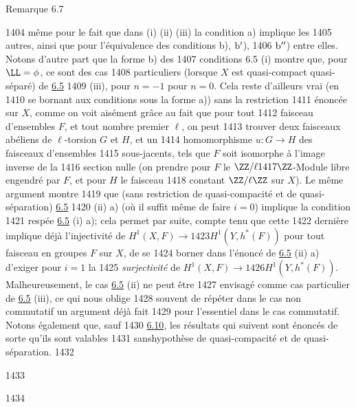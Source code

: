 \begin{enonce*}[remark]{Remarque 6.7}
\begin{enumerate}
  1404	même pour le fait que dans (i) (ii) (iii) la condition a) implique les
  1405	autres, ainsi que pour l'équivalence des conditions b), ${\rm b'}$),
  1406	${\rm b''}$) entre elles. Notons d'autre part que la forme b) des
  1407	conditions 6.5 (i) montre que, pour $\LL=\phi$, ce sont des cas
  1408	particuliers (lorsque $X$ est quasi-compact quasi-séparé) de \hyperref[XII.prop6.5]{6.5}
  1409	(iii), pour $n=-1$ \resp pour $n=0$. Cela reste d'ailleurs vrai (en
  1410	se bornant aux conditions sous la forme a)) sans la restriction
  1411	énoncée sur $X$, comme on voit aisément grâce au fait que pour tout
  1412	faisceau d'ensembles $F$, et tout nombre premier $\ell$, on peut
  1413	trouver deux faisceaux abéliens de $\ell$-torsion $G$ et $H$, et un
  1414	homomorphisme $u:G\rightarrow H$ des faisceaux d'ensembles
  1415	sous-jacents, tels que $F$ soit isomorphe à l'image inverse de la
  1416	section nulle (on prendre pour $F$ le $\ZZ/\ell
  1417	\ZZ$-Module libre engendré par $F$, et pour $H$ le faisceau
  1418	constant $\ZZ/\ell\ZZ$ sur $X$). Le même argument montre
  1419	que (sans restriction de quasi-compacité et de quasi-séparation) \hyperref[XII.prop6.5]{6.5}
  1420	(ii) a) (où il suffit même de faire $i=0$) implique la condition
  1421	respée \hyperref[XII.prop6.5]{6.5} (i) a); cela permet par suite, compte tenu que cette
  1422	dernière implique déjà l'injectivité de $H^1(X,F)\rightarrow
  1423	H^1(Y,h^{\ast}(F))$ pour tout faisceau en groupes $F$ sur $X$, de se
  1424	borner dans l'énoncé de \hyperref[XII.prop6.5]{6.5} (ii) a) d'exiger pour $i=1$ la
  1425	\emph{surjectivité} de $H^1(X,F)\rightarrow
  1426	H^1(Y,h^{\ast}(F))$. Malheureusement, le cas \hyperref[XII.prop6.5]{6.5} (ii) ne peut être
  1427	envisagé comme cas particulier de \hyperref[XII.prop6.5]{6.5} (iii), ce qui nous oblige
  1428	souvent de répéter dans le cas non commutatif un argument déjà fait
  1429	pour l'essentiel dans le cas commutatif. Notons également que, sauf
  1430	\hyperref[XII.cor6.10]{6.10}, les résultats qui suivent sont énoncés de sorte qu'ils sont valables
  1431	sans\pageoriginale hypothèse de quasi-compacité et de quasi-séparation.
  1432	\end{enumerate}
  1433	\end{enonce*}
  1434	
